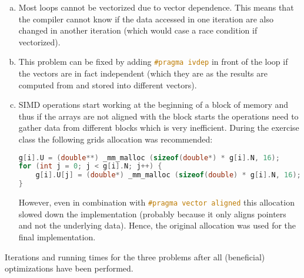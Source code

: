 \documentclass[11pt]{article}
\begin{document}
    \begin{enumerate}[a)]
        \item Most loops cannot be vectorized due to vector dependence.
        This means that the compiler cannot know if the data accessed in one
        iteration are also changed in another iteration (which would case a
        race condition if vectorized).
        \item This problem can be fixed by adding
        \lstinline[language=c++, basicstyle=\footnotesize]{#pragma ivdep}
        in front of the loop if the vectors are in fact independent (which
        they are as the results are computed from and stored into different
        vectors).
        \item SIMD operations start working at the beginning of a block of
        memory and thus if the arrays are not aligned with the block starts
        the operations need to gather data from different blocks which is
        very inefficient.
        During the exercise class the following grids allocation was
        recommended:
\begin{lstlisting}[language=c++, basicstyle=\scriptsize]
g[i].U = (double**) _mm_malloc (sizeof(double*) * g[i].N, 16);
for (int j = 0; j < g[i].N; j++) {
    g[i].U[j] = (double*) _mm_malloc (sizeof(double) * g[i].N, 16);
}
\end{lstlisting}
        However, even in combination with
        \lstinline[language=c++, basicstyle=\footnotesize]{#pragma vector aligned}
        this allocation slowed down the implementation (probably because it
        only aligns pointers and not the underlying data).
        Hence, the original allocation was used for the final implementation.
    \end{enumerate}

    \begin{table}[H]
        \caption{Iterations and running times for the three problems after
        all (beneficial) optimizations have been performed.}
        \begin{center}
            
        \end{center}
        \label{table:FinalTimes}
    \end{table}
\end{document}
